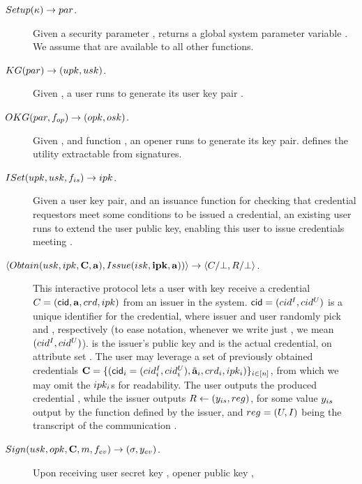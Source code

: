 \begin{description}
\item[$Setup(\kappa) \rightarrow par$.] Given a security parameter \secpar,
  returns a global system parameter variable \parm. We assume that \parm are
  available to all other functions.
\item[$\KeyGen(\parm) \rightarrow (%
  \upk,\usk)$.] Given \parm, a user
  runs \KeyGen to generate its user key pair%
  . 
\item[$OKG(par,f_{op}) \rightarrow (opk,osk)$.] Given \parm, and
  function \finsp, an opener runs \OKeyGen to generate its key pair. \finsp
  defines the utility extractable from signatures.
\item[$ISet(upk,usk,f_{is}) \rightarrow ipk$.] Given a user key
  pair, and an issuance function \fissue for checking that credential requestors
  meet some conditions to be issued a credential, an existing user runs \ISet to
  extend the user public key, enabling this user to issue credentials meeting
  \fissue.
\item[$\langle
  Obtain(usk,ipk,\mathbf{C},\mathbf{a}),
  Issue(isk,\mathbf{ipk},\mathbf{a}))  
  \rangle \rightarrow \langle C/\bot,R/\bot
  \rangle$.] %
  This interactive protocol lets a user with key \usk receive a credential
  $C=(\mathsf{cid},\mathbf{a},crd,ipk)$
  from an issuer in the system. $\mathsf{cid}=(cid^I,cid^U)$ is a unique identifier for
  the credential, where issuer and user randomly pick \cidi and \cidu,
  respectively (to ease notation, whenever we write just \cid, we mean $(cid^I,
  cid^U)$). \ipk is the issuer's public key and \cred is the actual credential,
  on attribute set \attrs. The user may leverage a set of previously obtained
  credentials $\mathbf{C}=\lbrace (\mathsf{cid}_i=(cid^I_i,cid^U_i),\tilde{\mathbf{a}}_i,crd_i,
  ipk_i)\rbrace_{i\in[n]}$, from which we may omit the $ipk_i$s for
  readability. The user outputs the produced credential \Cred, while the issuer
  outputs $R \gets (y_{is},reg)$, for some value $y_{is}$ output by
  the \fissue function defined by the issuer, and $reg=(U,I)$ being the
  transcript of the communication%
  .
\item[$Sign(usk,opk,\mathbf{C},m,f_{ev}) \rightarrow (\sigma,y_{ev})$.] %
  Upon receiving user secret key \usk, opener public key \opk, 

\end{description}
